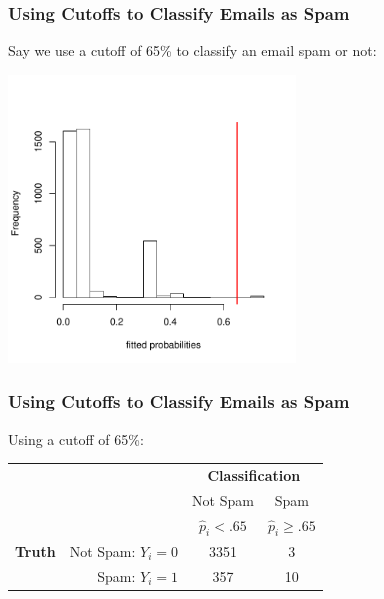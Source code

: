 \documentclass[slides]{beamer}
\newcommand{\blue}[1]{\textcolor{blue2}{#1}}
\begin{document}
\begin{frame}[fragile]
\frametitle{Using Cutoffs to Classify Emails as Spam}

Say we use a cutoff of 65\% to \blue{classify} an email spam or not:
\begin{center}
\includegraphics[width=3in]{figure/fitted2.pdf}
\end{center}

\end{frame}


\begin{frame}[fragile]
\frametitle{Using Cutoffs to Classify Emails as Spam}

Using a cutoff of 65\%:
\begin{center}
  \begin{tabular}{cr|cc}
     \multicolumn{2}{c}{}  & \multicolumn{2}{c}{\textbf{Classification}} \\ 
     &  & Not Spam & Spam \\ 
     &  & $\widehat{p}_i < .65$ & $\widehat{p}_i \geq .65$ \\ 
\hline
    \textbf{Truth} & Not Spam: $Y_i=0$ & 3351 & 3\\
     & Spam: $Y_i=1$ & 357 & 10\\ 
    \hline
  \end{tabular}
\end{center}
%
%


\end{frame}
\end{document}

